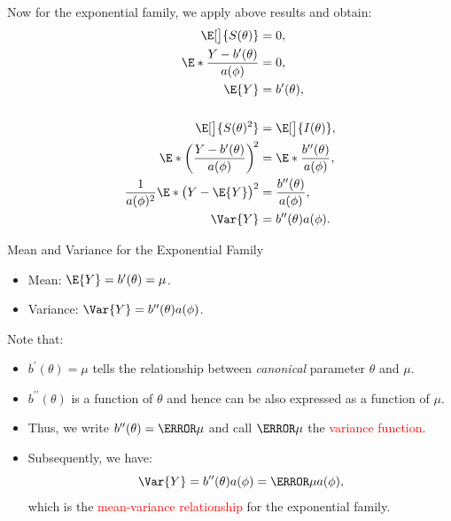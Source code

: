 \documentclass[oneside]{book}\usepackage[]{graphicx}\usepackage[svgnames]{xcolor}
\begin{document}
Now for the exponential family, we apply above results and obtain:
\begin{align*}
      \E[\big]{S(\theta)}                                          & =0,                                             \\
      \E*{\frac{Y-b^{\prime}(\theta)}{a(\phi)}}                    & =0,                                             \\
      \E{Y}                                                        & =b^\prime(\theta),                              \\\\
      \E[\big]{S(\theta)^2}                                        & =\E[\big]{I(\theta)},                           \\
      \E*{\biggl(\frac{Y-b^\prime(\theta)}{a(\phi)} \biggr)^{\!2}} & =\E*{\frac{b^{\prime\prime}(\theta)}{a(\phi)}}, \\
      \frac{1}{a(\phi)^2}\E*{\bigl(Y-\E{Y}\bigr)^2}                & =\frac{b^{\prime\prime}(\theta)}{a(\phi)},      \\
      \Var{Y}                                                      & =b^{\prime\prime}(\theta)a(\phi).
\end{align*}
\begin{Regular}{Mean and Variance for the Exponential Family}
      \begin{itemize}
            \item Mean: $ \E{Y}=b^\prime(\theta)=\mu $.
            \item Variance: $ \Var{Y}=b^{\prime\prime}(\theta)a(\phi) $.
      \end{itemize}
\end{Regular}
Note that:
\begin{itemize}
      \item $ b^\prime(\theta)=\mu $ tells the relationship between \emph{canonical} parameter $ \theta $ and $ \mu $.
      \item $ b^{\prime\prime}(\theta) $ is a function of $ \theta $ and hence can be also expressed as a function of $ \mu $.
      \item Thus, we write $ b^{\prime\prime}(\theta)=\V{\mu} $ and call \textcolor{Red}{$ \V{\mu} $} the \textcolor{Red}{variance function}.
      \item Subsequently, we have:
            \[ \Var{Y}=b^{\prime\prime}(\theta)a(\phi)=\V{\mu}a(\phi), \]
            which is the \textcolor{Red}{mean-variance relationship} for the exponential family.
\end{itemize}
\end{document}
